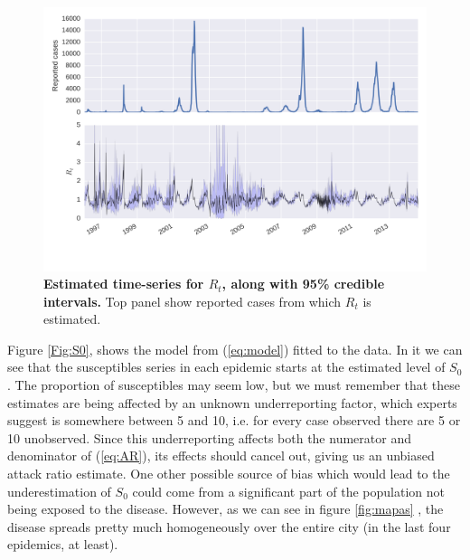 \begin{figure}
 \centering
 \includegraphics[width=16cm]{./plots/rt_series.png}

 \caption{{\bf Estimated time-series for $R_t$, along with 95\% credible 
intervals.} Top panel show reported cases from which $R_t$ is estimated.}
 \label{fig:rtseries}
\end{figure}


Figure \ref{Fig:S0}, shows the model from (\ref{eq:model}) fitted to the data. 
In it we can see that the susceptibles series in each epidemic starts at the 
estimated level of $S_0$.
The proportion of susceptibles may seem low, but we 
must remember that these estimates are being affected by an unknown 
underreporting factor, which experts suggest is somewhere between 5 and 10, 
i.e. for every case observed there are 5 or 10 unobserved.
Since this underreporting affects both the numerator and denominator of 
(\ref{eq:AR}), its effects should cancel out, giving us an unbiased attack ratio 
estimate.
One other possible source of bias which would lead to the 
underestimation of $S_0$ could come from a significant part of the population 
not being exposed to the disease.
However, as we can see in figure \ref{fig:mapas} , the disease spreads pretty 
much homogeneously over 
the entire city (in the last four epidemics, at least). 

